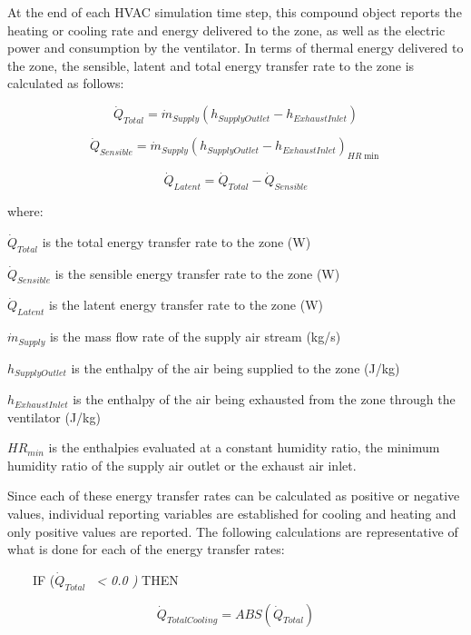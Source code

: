 At the end of each HVAC simulation time step, this compound object reports the heating or cooling rate and energy delivered to the zone, as well as the electric power and consumption by the ventilator. In terms of thermal energy delivered to the zone, the sensible, latent and total energy transfer rate to the zone is calculated as follows:

\begin{equation}
  \dot{Q}_{Total} = \dot{m}_{Supply} \left( h_{SupplyOutlet} - h_{ExhaustInlet} \right)
\end{equation}

\begin{equation}
  \dot{Q}_{Sensible} = \dot{m}_{Supply} \left( h_{SupplyOutlet} - h_{ExhaustInlet} \right)_{HR\min }
\end{equation}

\begin{equation}
  \dot{Q}_{Latent} = \dot{Q}_{Total} - \dot{Q}_{Sensible}
\end{equation}

where:

\(\dot{Q}_{Total}\) is the total energy transfer rate to the zone (W)

\(\dot{Q}_{Sensible}\) is the sensible energy transfer rate to the zone (W)

\(\dot{Q}_{Latent}\) is the latent energy transfer rate to the zone (W)

\(\dot{m}_{Supply}\) is the mass flow rate of the supply air stream (kg/s)

\(h_{SupplyOutlet}\) is the enthalpy of the air being supplied to the zone (J/kg)

\(h_{ExhaustInlet}\) is the enthalpy of the air being exhausted from the zone through the ventilator (J/kg)

\(HR_{min}\) is the enthalpies evaluated at a constant humidity ratio, the minimum humidity ratio of the supply air outlet or the exhaust air inlet.

Since each of these energy transfer rates can be calculated as positive or negative values, individual reporting variables are established for cooling and heating and only positive values are reported. The following calculations are representative of what is done for each of the energy transfer rates:

~~~~IF (\({\dot Q_{Total}}\) \emph{~\textless{} 0.0 )} THEN

\begin{equation}
{\dot Q_{TotalCooling}} = ABS ({\dot Q_{Total}})
\end{equation}

